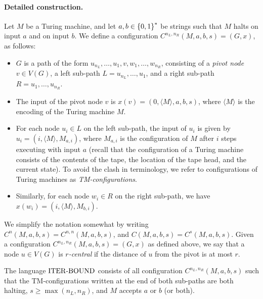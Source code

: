 \paragraph{Detailed construction.}
Let $M$ be a Turing machine,
and let $a,b \in \left \{{0,1} \right \}^*$ be strings such that $M$ halts on input $a$ and on input $b$.
We define a configuration $C^{n_L, n_R}({M,a,b, s}) = (G, x)$, as follows:
\begin{itemize}
	\item $G$ is a path of the form $u_{n_L},\ldots,u_1,v,w_1,\ldots,w_{n_R}$,
		consisting of a \emph{pivot node} $v \in V(G)$,
		a left sub-path $L = u_{n_L},\ldots,u_{1}$,
		and a right sub-path $R = u_1,\ldots,u_{n_R}$.
	\item The input of the pivot node $v$ is $x(v) = (0, \langle M \rangle, a, b, s )$,
		where $\langle M \rangle$ is the encoding of the Turing machine $M$.
	\item For each node $u_i \in L$ on the left sub-path, the input of $u_i$
		is given by $u_i = (i, \langle M \rangle, M_{a,i} )$,
		where $M_{a,i}$ is the configuration of $M$ after $i$ steps
		executing with input $a$
		(recall that the configuration of a Turing machine
		consists of the contents of the tape, the location of the tape head,
		and the current state).
		To avoid the clash in terminology, we refer to configurations of Turing machines
		as \emph{TM-configurations}.
	\item Similarly, for each node $w_i \in R$ on the right sub-path,
		we have $x(w_i) = (i, \langle M \rangle, M_{b,i} )$.
\end{itemize}

We simplify the notation somewhat by writing $C^n(M,a,b,s) = C^{n,n}(M,a,b,s)$,
and $C(M,a,b,s) = C^s(M,a,b,s)$.
Given a configuration $C^{n_L, n_R}({M,a,b,s}) = (G, x)$ as defined above,
we say that a node $u \in V(G)$ is \emph{$r$-central} if the distance of $u$
from the pivot is at most $r$.

The language ${\mathrm{ITER\text{-}BOUND}}$ consists of all configuration $C^{n_L,n_R}(M,a,b,s)$ such that
	the TM-configurations written at the end of both sub-paths are both halting,
	$s \geq \max(n_L, n_R)$,
	and $M$ accepts $a$ or $b$ (or both).

